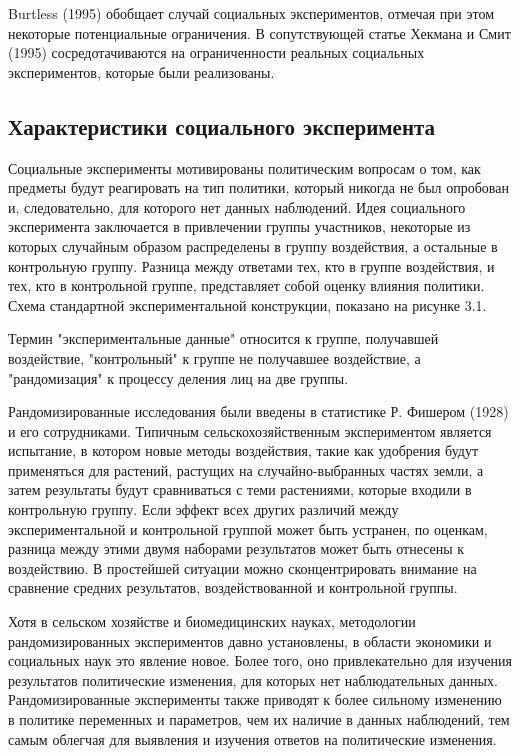 Burtless (1995) обобщает случай социальных экспериментов, отмечая при этом некоторые потенциальные ограничения. В сопутствующей статье Хекмана и Смит (1995) сосредотачиваются на ограниченности реальных социальных экспериментов, которые были реализованы. 


\subsection{Характеристики социального эксперимента}


Социальные эксперименты мотивированы политическим вопросам о том, как предметы будут реагировать на тип политики, который никогда не был опробован и, следовательно, для которого нет данных наблюдений. Идея социального эксперимента заключается в привлечении группы участников, некоторые из которых случайным образом распределены в группу воздействия, а остальные в контрольную группу. Разница между ответами тех, кто в группе воздействия, и тех, кто в контрольной группе, представляет собой оценку влияния политики. Схема стандартной экспериментальной конструкции,  показано на рисунке 3.1.


Термин "экспериментальные данные" относится к группе, получавшей воздействие, "контрольный" к группе не получавшее воздействие, а "рандомизация" к процессу деления лиц на две группы.


Рандомизированные исследования были введены в статистике Р. Фишером (1928) и его сотрудниками. Типичным сельскохозяйственным экспериментом является испытание, в котором новые методы воздействия, такие как удобрения будут применяться для растений, растущих на случайно-выбранных частях земли, а затем результаты будут сравниваться с теми растениями, которые входили в контрольную группу. Если эффект всех других различий между экспериментальной и контрольной группой может быть устранен, по оценкам, разница между этими двумя наборами результатов может быть отнесены к воздействию. В простейшей ситуации можно сконцентрировать внимание на сравнение средних результатов, воздействованной и контрольной группы.


Хотя в сельском хозяйстве и биомедицинских науках, методологии рандомизированных экспериментов давно установлены, в области экономики и социальных наук это явление новое. Более того, оно привлекательно для изучения результатов политические изменения, для которых нет наблюдательных данных. Рандомизированные эксперименты также приводят к более сильному изменению в политике переменных и параметров, чем их наличие в данных наблюдений, тем самым облегчая для выявления и изучения ответов на политические изменения.


